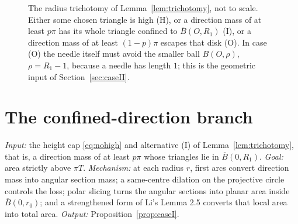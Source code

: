 \documentclass[11pt]{article}
\theoremstyle{plain}
\theoremstyle{definition}
\theoremstyle{remark}
\begin{document}
\begin{figure}[t]
\centering
{}
\caption{The radius trichotomy of Lemma~\ref{lem:trichotomy}, not to scale.
Either some chosen triangle is high (H), or a direction mass of at least $p\pi$
has its whole triangle confined to $\overline B(O,R_{1})$ (I), or a direction
mass of at least $(1-p)\pi$ escapes that disk (O). In case (O) the needle itself
must avoid the smaller ball $B(O,\rho)$, $\rho=R_{1}-1$, because a needle has
length $1$; this is the geometric input of Section~\ref{sec:caseII}.}
\label{fig:trichotomy}
\end{figure}

\section{The confined-direction branch}\label{sec:caseI}

\emph{Input:} the height cap \eqref{eq:nohigh} and alternative (I) of
Lemma~\ref{lem:trichotomy}, that is, a direction mass of at least $p\pi$ whose
triangles lie in $\overline B(0,R_{1})$. \emph{Goal:} area strictly above
$\pi T$. \emph{Mechanism:} at each radius $r$, first arcs convert direction mass
into angular section mass; a same-centre dilation on the projective circle
controls the loss; polar slicing turns the angular sections into planar area
inside $\overline B(0,r_{0})$; and a strengthened form of Li's Lemma 2.5
converts that local area into total area. \emph{Output:}
Proposition~\ref{prop:caseI}.
\end{document}
